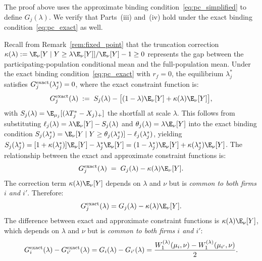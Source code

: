 \begin{remark}
\label{rem:monotone_exact}
The proof above uses the approximate binding condition~\eqref{eq:pc_simplified} to define $G_j(\lambda)$. We verify that Parts~(iii) and~(iv) hold under the exact binding condition~\eqref{eq:pc_exact} as well.

Recall from Remark~\ref{rem:fixed_point} that the truncation correction $\kappa(\lambda) := \E_\nu[Y \mid Y \geq \lambda\E_\nu[Y]]/\E_\nu[Y] - 1 \geq 0$ represents the gap between the participating-population conditional mean and the full-population mean. Under the exact binding condition~\eqref{eq:pc_exact} with $r_f = 0$, the equilibrium $\lambda_j^*$ satisfies $G_j^{\rm exact}(\lambda_j^*) = 0$, where the exact constraint function is:
\[
  G_j^{\rm exact}(\lambda) \;:=\; S_j(\lambda) - \bigl[(1-\lambda)\E_\nu[Y] + \kappa(\lambda)\E_\nu[Y]\bigr],
\]
with $S_j(\lambda) = \E_{\mu_j}[(\lambda T_j^* - X_j)_+]$ the shortfall at scale $\lambda$. This follows from substituting $\ell_j(\lambda) = \lambda\E_\nu[Y] - S_j(\lambda)$ and $\theta_j(\lambda) = \lambda\E_\nu[Y]$ into the exact binding condition $S_j(\lambda_j^*) = \E_\nu[Y \mid Y \geq \theta_j(\lambda_j^*)] - \ell_j(\lambda_j^*)$, yielding $S_j(\lambda_j^*) = [1 + \kappa(\lambda_j^*)]\E_\nu[Y] - \lambda_j^*\E_\nu[Y] = (1-\lambda_j^*)\E_\nu[Y] + \kappa(\lambda_j^*)\E_\nu[Y]$. The relationship between the exact and approximate constraint functions is:
\[
  G_j^{\rm exact}(\lambda) \;=\; G_j(\lambda) - \kappa(\lambda)\E_\nu[Y].
\]
The correction term $\kappa(\lambda)\E_\nu[Y]$ depends on $\lambda$ and $\nu$ but is \emph{common to both firms $i$ and $i'$}. Therefore:
\[
  G_j^{\rm exact}(\lambda) = G_j(\lambda) - \kappa(\lambda)\E_\nu[Y].
\]
The difference between exact and approximate constraint functions is $\kappa(\lambda)\E_\nu[Y]$, which depends on $\lambda$ and $\nu$ but is \emph{common to both firms $i$ and $i'$}:
\[
  G_i^{\rm exact}(\lambda) - G_{i'}^{\rm exact}(\lambda) = G_i(\lambda) - G_{i'}(\lambda) = \frac{W_1^{(\lambda)}(\mu_i,\nu) - W_1^{(\lambda)}(\mu_{i'},\nu)}{2}.
\]

\end{remark}
